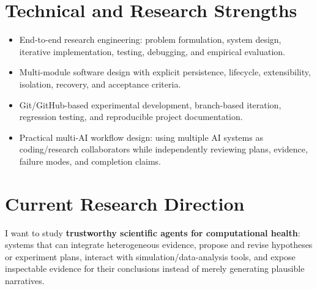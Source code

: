 \documentclass[10pt,a4paper]{article}
\begin{document}
\section{Technical and Research Strengths}
\begin{itemize}
  \item End-to-end research engineering: problem formulation, system design, iterative implementation, testing, debugging, and empirical evaluation.
  \item Multi-module software design with explicit persistence, lifecycle, extensibility, isolation, recovery, and acceptance criteria.
  \item Git/GitHub-based experimental development, branch-based iteration, regression testing, and reproducible project documentation.
  \item Practical multi-AI workflow design: using multiple AI systems as coding/research collaborators while independently reviewing plans, evidence, failure modes, and completion claims.
\end{itemize}

\section{Current Research Direction}
I want to study \textbf{trustworthy scientific agents for computational health}: systems that can integrate heterogeneous evidence, propose and revise hypotheses or experiment plans, interact with simulation/data-analysis tools, and expose inspectable evidence for their conclusions instead of merely generating plausible narratives.
\end{document}
